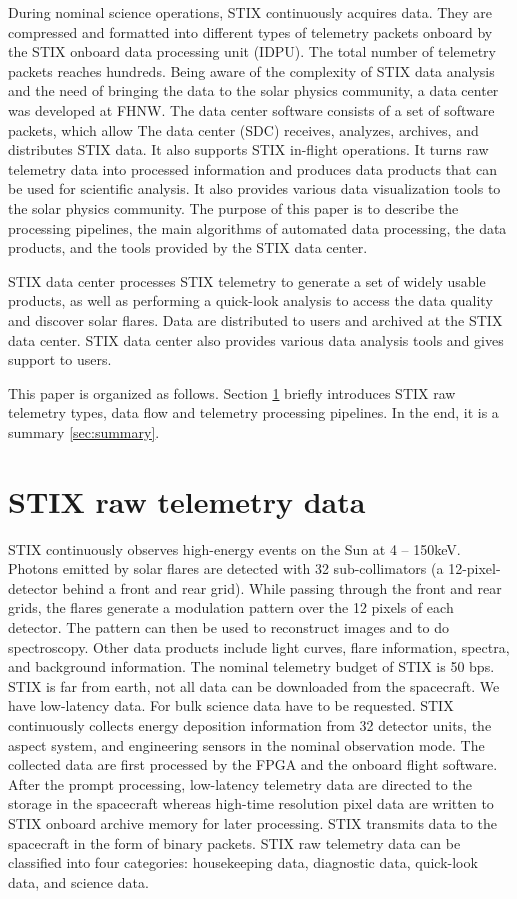 \documentclass[referee]{aa} %
\begin{document}
During nominal science operations, STIX continuously acquires data. They are compressed and formatted into different types of telemetry packets onboard by the 
STIX onboard data processing unit (IDPU). The total number of telemetry packets reaches hundreds. 
Being aware of the complexity of STIX data analysis and the need of bringing the data to the solar physics community, 
a data center was developed at FHNW. 
The data center software consists of a set of software packets, which allow 
The data center (SDC) receives, analyzes, archives, and distributes STIX data. 
It also supports STIX in-flight operations.
It turns raw telemetry data into processed information and produces data products that can be used for scientific analysis.
It also provides various data visualization tools to the solar physics community.
The purpose of this paper is to describe the processing pipelines, 
the main algorithms of automated data processing, the data products, and the tools provided by the STIX data center.

STIX data center processes STIX telemetry to generate a set of widely usable products, as well as performing a quick-look
analysis to access the data quality and discover solar flares. Data are distributed to users and archived at the STIX data center. 
STIX data center also provides various data analysis tools and gives support to users. 

This paper is organized as follows. Section \ref{sec:raw-data} briefly introduces STIX raw telemetry types, data flow and
telemetry processing pipelines. 
In the end, it is a summary \ref{sec:summary}.
\section{STIX raw telemetry data}
\label{sec:raw-data}
STIX continuously observes high-energy events on the Sun at 4 -- 150keV. 
Photons emitted by solar flares are detected with 32 sub-collimators 
(a 12-pixel-detector behind a front and rear grid). While passing through the front and rear grids, 
the flares generate a modulation pattern over the 12 pixels of each detector. 
The pattern can then be used to reconstruct images and to do spectroscopy. 
Other data products include light curves, flare information, spectra, and background information.
The nominal telemetry budget of STIX is 50 bps.
STIX is far from earth, not all data can be downloaded from the spacecraft. We have low-latency data.
For bulk science data have to be requested.
STIX continuously collects energy deposition information from 32 detector units, the aspect system,
and engineering sensors in the nominal observation mode.
The collected data are first processed by the FPGA and the onboard flight software.
After the prompt processing, low-latency telemetry data are directed to the
storage in the spacecraft whereas high-time resolution pixel data are written to STIX onboard archive memory for
later processing.
STIX transmits data to the spacecraft in the form of binary packets.
STIX raw telemetry data can be classified into four
categories: housekeeping data, diagnostic data, quick-look data, and science data.
\end{document}

